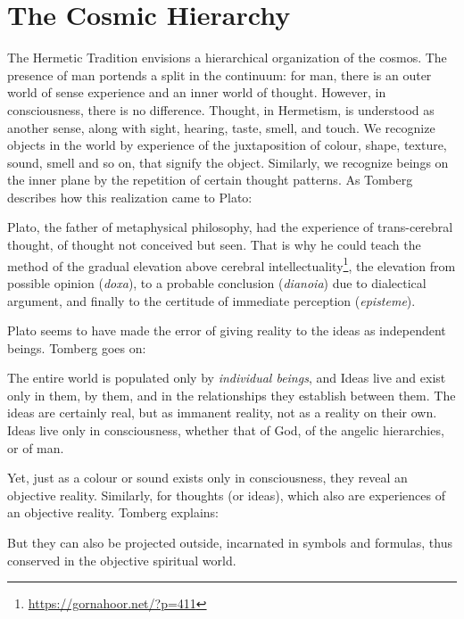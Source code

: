 \section{The Cosmic Hierarchy}

The Hermetic Tradition envisions a hierarchical organization of the cosmos. The presence of man portends a split in the continuum: for man, there is an outer world of sense experience and an inner world of thought. However, in consciousness, there is no difference. Thought, in Hermetism, is understood as another sense, along with sight, hearing, taste, smell, and touch. We recognize objects in the world by experience of the juxtaposition of colour, shape, texture, sound, smell and so on, that signify the object. Similarly, we recognize beings on the inner plane by the repetition of certain thought patterns. As Tomberg describes how this realization came to Plato:

\begin{quotex}
Plato, the father of metaphysical philosophy, had the experience of trans-cerebral thought, of thought not conceived but seen. That is why he could teach the method of the gradual elevation above cerebral intellectuality\footnote{\url{https://gornahoor.net/?p=411}}, the elevation from possible opinion (\emph{doxa}), to a probable conclusion (\emph{dianoia}) due to dialectical argument, and finally to the certitude of immediate perception (\emph{episteme}).
\end{quotex}


Plato seems to have made the error of giving reality to the ideas as independent beings. Tomberg goes on:

\begin{quotex}
The entire world is populated only by \emph{individual beings}, and Ideas live and exist only in them, by them, and in the relationships they establish between them. The ideas are certainly real, but as immanent reality, not as a reality on their own. Ideas live only in consciousness, whether that of God, of the angelic hierarchies, or of man.
\end{quotex}


Yet, just as a colour or sound exists only in consciousness, they reveal an objective reality. Similarly, for thoughts (or ideas), which also are experiences of an objective reality. Tomberg explains:

\begin{quotex}
But they can also be projected outside, incarnated in symbols and formulas, thus conserved in the objective spiritual world.
\end{quotex}


